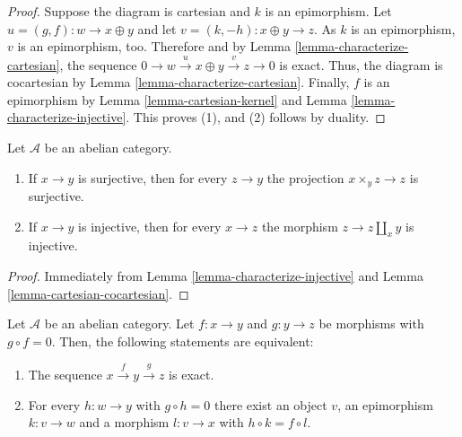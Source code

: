 \begin{proof}
Suppose the diagram is cartesian and $k$ is
an epimorphism.
Let $u = (g, f) : w \to x \oplus y$ and let
$v = (k, -h) : x \oplus y \to z$.
As $k$ is an epimorphism, $v$ is an
epimorphism, too. Therefore
and by Lemma
\ref{lemma-characterize-cartesian}, the
sequence
$0\to w\overset{u}\to x\oplus y\overset{v}\to
z\to 0$ is exact. Thus, the
diagram is cocartesian by Lemma
\ref{lemma-characterize-cartesian}. Finally,
$f$ is an epimorphism by Lemma
\ref{lemma-cartesian-kernel} and
Lemma \ref{lemma-characterize-injective}.
This proves (1), and (2)
follows by duality.
\end{proof}

\begin{lemma}
\label{lemma-epimo-unive-abeli-categ}
Let $\mathcal{A}$ be an abelian category.
\begin{enumerate}
\item If $x \to y$ is surjective, then for
every $z \to y$ the
projection $x \times_y z \to z$ is
surjective.
\item If $x \to y$ is injective, then for
every $x \to z$ the
morphism $z \to z \amalg_x y$ is injective.
\end{enumerate}
\end{lemma}

\begin{proof}
Immediately from Lemma
\ref{lemma-characterize-injective} and
Lemma \ref{lemma-cartesian-cocartesian}.
\end{proof}

\begin{lemma}
\label{lemma-check-exactness-fibre-product}
Let $\mathcal{A}$ be an abelian category. Let
$f:x\to y$ and $g:y\to z$
be morphisms with $g\circ f=0$. Then, the
following statements are equivalent:
\begin{enumerate}
\item The sequence $x\overset{f}\to
y\overset{g}\to z$ is exact.
\item For every $h:w\to y$ with $g\circ h=0$
there exist an object $v$,
an epimorphism $k:v\to w$ and a morphism
$l:v\to x$ with $h\circ k=f\circ l$.
\end{enumerate}
\end{lemma}

